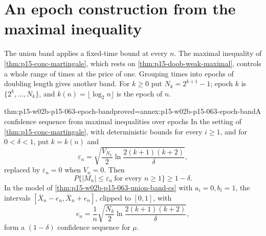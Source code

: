 \section{An epoch construction from the maximal inequality}
\label{sec:p15-w02b-p15-063-epochs}

The union band applies a fixed-time bound at every \(n\). The maximal
inequality of \cref{thm:p15-conc-martingale}, which rests on
\cref{thm:p15-doob-weak-maximal}, controls a whole range of times at the
price of one. Grouping times into epochs of doubling length gives
another band. For \(k\geq0\) put \(N_k=2^{k+1}-1\); epoch \(k\) is
\(\{2^k,\ldots,N_k\}\), and \(k(n)=\lfloor\log_2n\rfloor\) is the epoch
of \(n\).

\begin{hbtheorem}{thm:p15-w02b-p15-063-epoch-band}{proved=annex:p15-w02b-p15-063-epoch-band}{A confidence sequence from maximal inequalities over epochs}
In the setting of \cref{thm:p15-conc-martingale}, with deterministic
bounds for every \(i\geq1\), and for \(0<\delta<1\), put \(k=k(n)\) and
\[
 \varepsilon_n=\sqrt{\frac{V_{N_k}}2\ln\frac{2(k+1)(k+2)}\delta},
\]
replaced by \(\varepsilon_n=0\) when \(V_n=0\). Then
\[
 P\{|M_n|\leq\varepsilon_n\ \text{for every }n\geq1\}\geq1-\delta.
\]
In the model of \cref{thm:p15-w02b-p15-063-union-band-cs} with
\(a_i=0,b_i=1\), the intervals
\([\overline X_n-e_n,\overline X_n+e_n]\), clipped to \([0,1]\), with
\[
 e_n=\frac1n\sqrt{\frac{N_k}2\ln\frac{2(k+1)(k+2)}\delta},
\]
form a \((1-\delta)\) confidence sequence for \(\mu\).
\end{hbtheorem}

